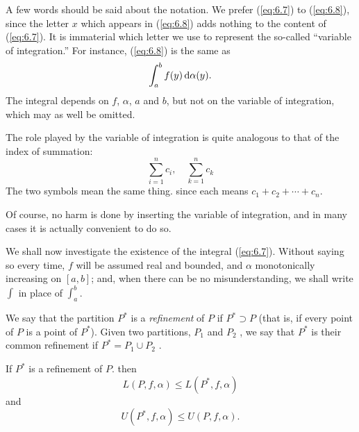 \begin{myDef}
    A few words should be said about the notation. 
    We prefer (\ref{eq:6.7}) to (\ref{eq:6.8}), since
    the letter $x$ which appears in (\ref{eq:6.8}) 
    adds nothing to the content of (\ref{eq:6.7}). 
    It is immaterial which letter we use to represent the so-called 
    ``variable of integration.''
    For instance, (\ref{eq:6.8}) is the same as
    \begin{equation*}
        \int_{a}^{b} f(y) \d \alpha (y).
    \end{equation*}
    The integral depends on $f$, $\alpha$, $a$ and $b$, 
    but not on the variable of integration, 
    which may as well be omitted.

    The role played by the variable of integration is quite analogous to that
    of the index of summation: 
    \begin{equation*}
        \sum_{i=1}^{n} c_i , \quad
        \sum_{k=1}^{n} c_k 
    \end{equation*}
    The two symbols mean the same thing. 
    since each means $c_1 + c_2 + \cdots + c_n$.
    
    Of course, no harm is done by inserting the variable of integration, 
    and in many cases it is actually convenient to do so.
    
    We shall now investigate the existence of the integral (\ref{eq:6.7}). 
    Without saying so every time, 
    $f$ will be assumed real and bounded, 
    and $\alpha$ monotonically increasing on $[a, b]$; 
    and, when there can be no misunderstanding, 
    we shall write $\int$ in place of $\int_{a}^{b}$.
\end{myDef}

\begin{myDef}
    \label{myDef:6.3}
    We say that the partition $P^*$ is a \emph{refinement} of $P$ 
    if $P^* \supset P$
    (that is, if every point of $P$ is a point of $P^*$). 
    Given two partitions, $P_1$ and $P_2$ ,
    we say that $P^*$ is their common refinement if $P^* = P_1 \cup P_2$ .
\end{myDef}

\begin{thm}
    \label{thm:6.4}
    If $P^*$ is a refinement of $P$. then
    \begin{equation}
        \label{eq:6.9}
        L(P,   f, \alpha) \leq 
        L(P^*, f, \alpha) 
    \end{equation}
    and 
    \begin{equation}
        \label{eq:6.10}
        U(P^*, f, \alpha) \leq 
        U(P,   f, \alpha) .
    \end{equation}
\end{thm}

